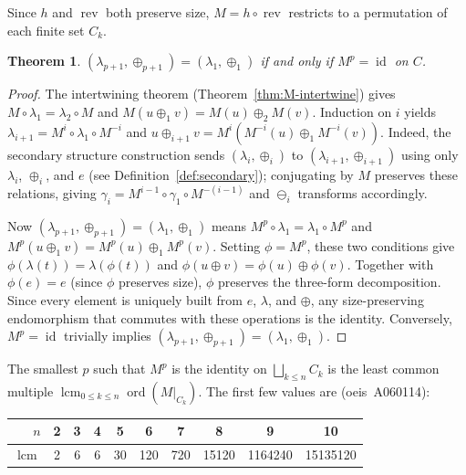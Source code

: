 \documentclass[a4paper,11pt]{article}
\newtheorem{theorem}{Theorem}[section]
\theoremstyle{definition}
\DeclareMathOperator{\rev}{rev}
\newcommand\oeis{{\sc oeis}}
\begin{document}
Since $h$ and $\rev$ both preserve size,
$M = h \circ \rev$ restricts to a permutation of each
finite set $C_k$.

\begin{theorem}\label{thm:period}
$(\lambda_{p+1}, \oplus_{p+1})
= (\lambda_1, \oplus_1)$ if and only if
$M^p = \operatorname{id}$ on $C$.
\end{theorem}

\begin{proof}
The intertwining theorem (Theorem~\ref{thm:M-intertwine}) gives
$M \circ \lambda_1 = \lambda_2 \circ M$ and
$M(u \oplus_1 v) = M(u) \oplus_2 M(v)$.
Induction on $i$ yields
$\lambda_{i+1} = M^i \circ \lambda_1 \circ M^{-i}$
and
$u \oplus_{i+1} v
= M^i(M^{-i}(u) \oplus_1 M^{-i}(v))$.
Indeed, the secondary structure construction
sends $(\lambda_i, \oplus_i)$ to
$(\lambda_{i+1}, \oplus_{i+1})$ using only
$\lambda_i$, $\oplus_i$, and $e$
(see Definition~\ref{def:secondary}); conjugating by $M$
preserves these relations, giving
$\gamma_i = M^{i-1} \circ \gamma_1 \circ M^{-(i-1)}$
and $\ominus_i$ transforms accordingly.

Now $(\lambda_{p+1}, \oplus_{p+1})
= (\lambda_1, \oplus_1)$ means
$M^p \circ \lambda_1 = \lambda_1 \circ M^p$ and
$M^p(u \oplus_1 v) = M^p(u) \oplus_1 M^p(v)$. Setting
$\phi = M^p$, these two conditions give
$\phi(\lambda(t)) = \lambda(\phi(t))$ and
$\phi(u \oplus v) = \phi(u) \oplus \phi(v)$. Together
with $\phi(e) = e$ (since $\phi$ preserves size), $\phi$
preserves the three-form decomposition. Since every
element is uniquely built from $e$, $\lambda$, and
$\oplus$, any size-preserving endomorphism that commutes
with these operations is the identity.
Conversely, $M^p = \operatorname{id}$
trivially implies
$(\lambda_{p+1}, \oplus_{p+1})
= (\lambda_1, \oplus_1)$.
\end{proof}

The smallest $p$ such that $M^p$ is the identity on $\bigsqcup_{k \leq n} C_k$
is the least common multiple
$\operatorname{lcm}_{0 \leq k \leq n} \operatorname{ord}(M|_{C_k})$.  The first
few values are (\oeis\ A060114):

\begin{center}
\begin{tabular}{r|ccccccccc}
$n$ & 2 & 3 & 4 & 5 & 6 & 7 & 8 & 9 & 10 \\
\hline
$\operatorname{lcm}$ & 2 & 6 & 6 & 30 & 120 & 720 &
  15120 & 1164240 & 15135120
\end{tabular}
\end{center}
\end{document}
